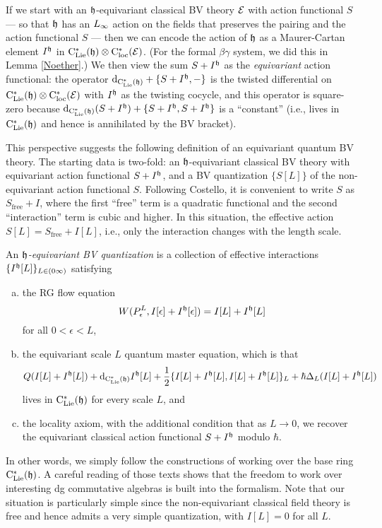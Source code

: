 If we start with an $\mathfrak h$-equivariant classical BV theory $\mathcal E$ with action functional $S$ --- so that $\mathfrak h$ has an $\L8$ action on the fields that preserves the pairing and the action functional $S$ --- then we can encode the action of $\mathfrak h$ as a Maurer-Cartan element $I^\mathfrak h$ in ${\rm C}_{\rm Lie}^*(\mathfrak h) \otimes {\rm C}^*_{\rm loc}(\mathcal E)$.
(For the formal $\beta\gamma$ system, we did this in Lemma \ref{Noether}.)
We then view the sum $S + I^\mathfrak h$ as the \emph{equivariant} action functional:
the operator ${\rm d}_{{\rm C}_{\rm Lie}^*(\mathfrak h)} + \{S+ I^\mathfrak h,-\}$ is the twisted differential on ${\rm C}_{\rm Lie}^*(\mathfrak h) \otimes {\rm C}^*_{\rm loc}(\mathcal E)$ with $I^\mathfrak h$ as the twisting cocycle,
and this operator is square-zero because ${\rm d}_{{\rm C}_{\rm Lie}^*(\mathfrak h)}(S + I^\mathfrak h) + \{S + I^\mathfrak h, S+ I^\mathfrak h\}$ is a ``constant'' (i.e., lives in ${\rm C}_{\rm Lie}^*(\mathfrak h)$ and hence is annihilated by the BV bracket).

This perspective suggests the following definition of an equivariant quantum BV theory.
The starting data is two-fold:
an $\mathfrak h$-equivariant classical BV theory with equivariant action functional $S+I^\mathfrak h$, 
and a BV quantization $\{S[L]\}$ of the non-equivariant action functional $S$.
Following Costello, it is convenient to write $S$ as $S_{\text{free}} + I$, 
where the first ``free'' term is a quadratic functional and the second ``interaction'' term is cubic and higher.
In this situation, the effective action $S[L] = S_{\text{free}} + I[L]$, 
i.e., only the interaction changes with the length scale.

\begin{dfn} \label{eqQFT} 
An {\em $\mathfrak h$-equivariant BV quantization} is a collection of effective interactions $\{I^\mathfrak h[L]\}_{L \in (0\infty)}$
satisfying
\begin{enumerate}[(a)]
\item the RG flow equation
\[
W(P_\epsilon^L, I[\epsilon]+I^\mathfrak h[\epsilon]) = I[L] + I^\mathfrak h[L]
\]
for all $0 < \epsilon < L$,
\item the equivariant scale $L$ quantum master equation, which is that
\[
Q(I[L]+I^\mathfrak h[L]) + {\rm d}_{{\rm C}_{\rm Lie}^*(\mathfrak h)} I^\mathfrak h[L] + \frac{1}{2}\{I[L]+I^\mathfrak h[L],I[L]+I^\mathfrak h[L]\}_{L} + \hbar \Delta_L(I[L]+I^\mathfrak h[L])
\]
lives in ${\rm C}_{\rm Lie}^*(\mathfrak h)$ for every scale $L$, and
\item the locality axiom, with the additional condition that as $L \to 0$, we recover the equivariant classical action functional $S+ I^\mathfrak h$ modulo $\hbar$.
\end{enumerate}
\end{dfn}

In other words, we simply follow the constructions of \cite{CosBook,CG2} working over the base ring ${\rm C}_{\rm Lie}^*(\mathfrak h)$.
A careful reading of those texts shows that the freedom to work over interesting dg commutative algebras is built into the formalism.
Note that our situation is particularly simple since the non-equivariant classical field theory is free and hence admits a very simple quantization,
with $I[L] = 0$ for all $L$.

